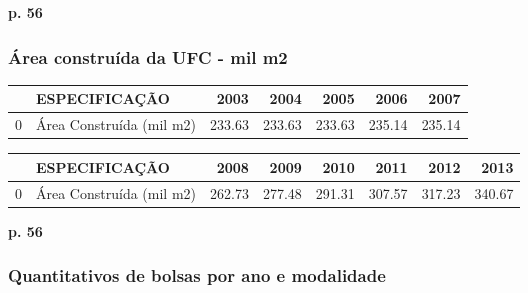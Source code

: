 \documentclass{article}
\begin{document}
\textbf{p. 56}

\subsubsection{Área construída da UFC - mil m2}
\begin{tabular}{llrrrrr}
\toprule
{} &             ESPECIFICAÇÃO &    2003 &    2004 &    2005 &    2006 &    2007 \\
\midrule
0 &  Área Construída (mil m2) &  233.63 &  233.63 &  233.63 &  235.14 &  235.14 \\
\bottomrule
\end{tabular}

\begin{tabular}{llrrrrrr}
\toprule
{} &             ESPECIFICAÇÃO &    2008 &    2009 &    2010 &    2011 &    2012 &    2013 \\
\midrule
0 &  Área Construída (mil m2) &  262.73 &  277.48 &  291.31 &  307.57 &  317.23 &  340.67 \\
\bottomrule
\end{tabular}
\textbf{p. 56}


\subsubsection{Quantitativos de bolsas por ano e modalidade}
\end{document}
